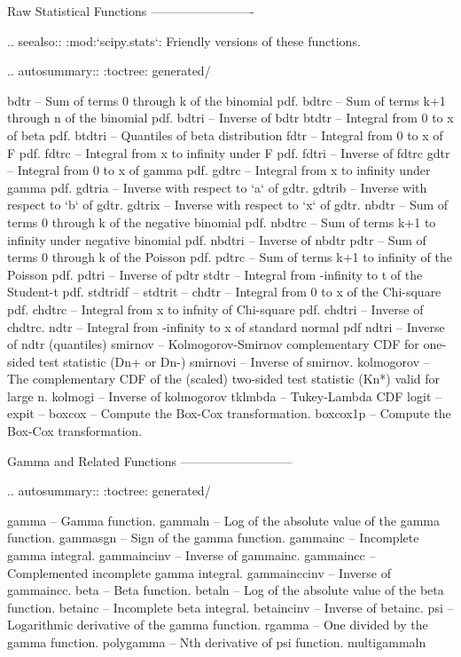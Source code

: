 \begin{DoxyVerb}
Raw Statistical Functions
-------------------------

.. seealso:: :mod:`scipy.stats`: Friendly versions of these functions.

.. autosummary::
   :toctree: generated/

   bdtr       -- Sum of terms 0 through k of the binomial pdf.
   bdtrc      -- Sum of terms k+1 through n of the binomial pdf.
   bdtri      -- Inverse of bdtr
   btdtr      -- Integral from 0 to x of beta pdf.
   btdtri     -- Quantiles of beta distribution
   fdtr       -- Integral from 0 to x of F pdf.
   fdtrc      -- Integral from x to infinity under F pdf.
   fdtri      -- Inverse of fdtrc
   gdtr       -- Integral from 0 to x of gamma pdf.
   gdtrc      -- Integral from x to infinity under gamma pdf.
   gdtria     -- Inverse with respect to `a` of gdtr.
   gdtrib     -- Inverse with respect to `b` of gdtr.
   gdtrix     -- Inverse with respect to `x` of gdtr.
   nbdtr      -- Sum of terms 0 through k of the negative binomial pdf.
   nbdtrc     -- Sum of terms k+1 to infinity under negative binomial pdf.
   nbdtri     -- Inverse of nbdtr
   pdtr       -- Sum of terms 0 through k of the Poisson pdf.
   pdtrc      -- Sum of terms k+1 to infinity of the Poisson pdf.
   pdtri      -- Inverse of pdtr
   stdtr      -- Integral from -infinity to t of the Student-t pdf.
   stdtridf   --
   stdtrit    --
   chdtr      -- Integral from 0 to x of the Chi-square pdf.
   chdtrc     -- Integral from x to infnity of Chi-square pdf.
   chdtri     -- Inverse of chdtrc.
   ndtr       -- Integral from -infinity to x of standard normal pdf
   ndtri      -- Inverse of ndtr (quantiles)
   smirnov    -- Kolmogorov-Smirnov complementary CDF for one-sided test statistic (Dn+ or Dn-)
   smirnovi   -- Inverse of smirnov.
   kolmogorov -- The complementary CDF of the (scaled) two-sided test statistic (Kn*) valid for large n.
   kolmogi    -- Inverse of kolmogorov
   tklmbda    -- Tukey-Lambda CDF
   logit      --
   expit      --
   boxcox     -- Compute the Box-Cox transformation.
   boxcox1p   -- Compute the Box-Cox transformation.

Gamma and Related Functions
---------------------------

.. autosummary::
   :toctree: generated/

   gamma        -- Gamma function.
   gammaln      -- Log of the absolute value of the gamma function.
   gammasgn     -- Sign of the gamma function.
   gammainc     -- Incomplete gamma integral.
   gammaincinv  -- Inverse of gammainc.
   gammaincc    -- Complemented incomplete gamma integral.
   gammainccinv -- Inverse of gammaincc.
   beta         -- Beta function.
   betaln       -- Log of the absolute value of the beta function.
   betainc      -- Incomplete beta integral.
   betaincinv   -- Inverse of betainc.
   psi          -- Logarithmic derivative of the gamma function.
   rgamma       -- One divided by the gamma function.
   polygamma    -- Nth derivative of psi function.
   multigammaln



\end{DoxyVerb}
